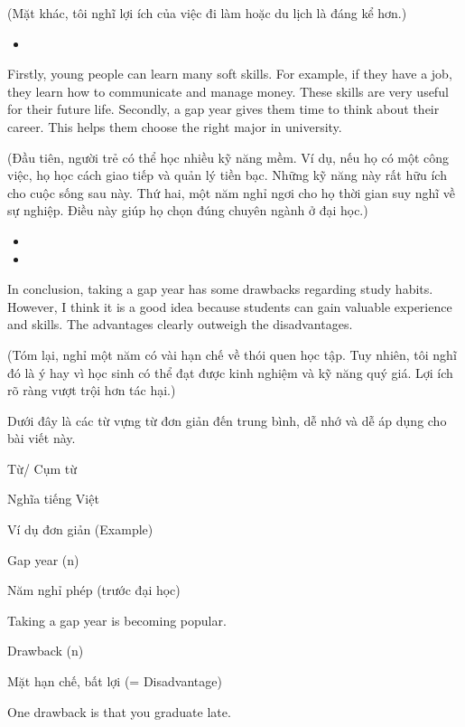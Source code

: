 \documentclass{../templateWriting/cdwriting}
\begin{document}
(Mặt khác, tôi nghĩ lợi ích của việc đi làm hoặc du lịch là đáng kể hơn.)
\begin{itemize}
\item {}
\end{itemize}

Firstly, young people can learn many soft skills. For example, if they have a job, they learn how to communicate and manage money. These skills are very useful for their future life. Secondly, a gap year gives them time to think about their career. This helps them choose the right major in university.

(Đầu tiên, người trẻ có thể học nhiều kỹ năng mềm. Ví dụ, nếu họ có một công việc, họ học cách giao tiếp và quản lý tiền bạc. Những kỹ năng này rất hữu ích cho cuộc sống sau này. Thứ hai, một năm nghỉ ngơi cho họ thời gian suy nghĩ về sự nghiệp. Điều này giúp họ chọn đúng chuyên ngành ở đại học.)

\begin{itemize}
\item {}
\item {}
\end{itemize}

In conclusion, taking a gap year has some drawbacks regarding study habits. However, I think it is a good idea because students can gain valuable experience and skills. The advantages clearly outweigh the disadvantages.

(Tóm lại, nghỉ một năm có vài hạn chế về thói quen học tập. Tuy nhiên, tôi nghĩ đó là ý hay vì học sinh có thể đạt được kinh nghiệm và kỹ năng quý giá. Lợi ích rõ ràng vượt trội hơn tác hại.)


Dưới đây là các từ vựng từ đơn giản đến trung bình, dễ nhớ và dễ áp dụng cho bài viết này.

Từ/ Cụm từ

Nghĩa tiếng Việt

Ví dụ đơn giản (Example)

Gap year (n)

Năm nghỉ phép (trước đại học)

Taking a gap year is becoming popular.

Drawback (n)

Mặt hạn chế, bất lợi (= Disadvantage)

One drawback is that you graduate late.
\end{document}
